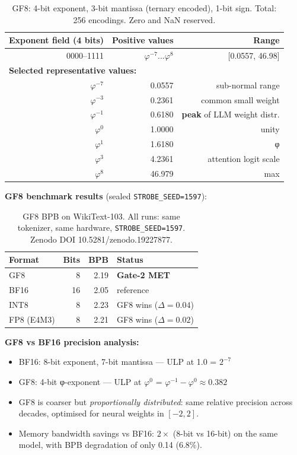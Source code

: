 \begin{table}[h]
\centering
\begin{tabular}{rrr}
\toprule
\textbf{Exponent field (4 bits)} & \textbf{Positive values} &
\textbf{Range} \\
\midrule
0000--1111 & $\varphi^{-7}$...$\varphi^{8}$ & [0.0557, 46.98] \\
\midrule
\multicolumn{3}{l}{\textbf{Selected representative values:}} \\
\midrule
$\varphi^{-7}$ & 0.0557 & sub-normal range \\
$\varphi^{-3}$ & 0.2361 & common small weight \\
$\varphi^{-1}$ & 0.6180 & \textbf{peak} of LLM weight distr. \\
$\varphi^{0}$  & 1.0000 & unity \\
$\varphi^{1}$  & 1.6180 & φ \\
$\varphi^{3}$  & 4.2361 & attention logit scale \\
$\varphi^{8}$  & 46.979 & max \\
\bottomrule
\end{tabular}
\caption{GF8: 4-bit exponent, 3-bit mantissa (ternary encoded), 1-bit
sign.  Total: 256 encodings.  Zero and NaN reserved.}
\end{table}

\textbf{GF8 benchmark results} (sealed \texttt{STROBE\_SEED=1597}):
\begin{table}[h]
\centering
\begin{tabular}{lrrl}
\toprule
\textbf{Format} & \textbf{Bits} & \textbf{BPB} & \textbf{Status} \\
\midrule
GF8       & 8  & 2.19 & \textbf{Gate-2 MET} \\
BF16      & 16 & 2.05 & reference \\
INT8      & 8  & 2.23 & GF8 wins ($\Delta=0.04$) \\
FP8 (E4M3)& 8  & 2.21 & GF8 wins ($\Delta=0.02$) \\
\bottomrule
\end{tabular}
\caption{GF8 BPB on WikiText-103.  All runs: same tokenizer, same
hardware, \texttt{STROBE\_SEED=1597}.
Zenodo DOI 10.5281/zenodo.19227877.}
\end{table}

\textbf{GF8 vs BF16 precision analysis:}
\begin{itemize}
  \item BF16: 8-bit exponent, 7-bit mantissa --- ULP at 1.0 = $2^{-7}$
  \item GF8: 4-bit φ-exponent --- ULP at $\varphi^0$ =
        $\varphi^{-1} - \varphi^0 \approx 0.382$
  \item GF8 is coarser but \emph{proportionally distributed}: same
        relative precision across decades, optimised for neural weights
        in $[-2, 2]$.
  \item Memory bandwidth savings vs BF16: $2\times$ (8-bit vs 16-bit)
        on the same model, with BPB degradation of only 0.14 (6.8\%).
\end{itemize}


